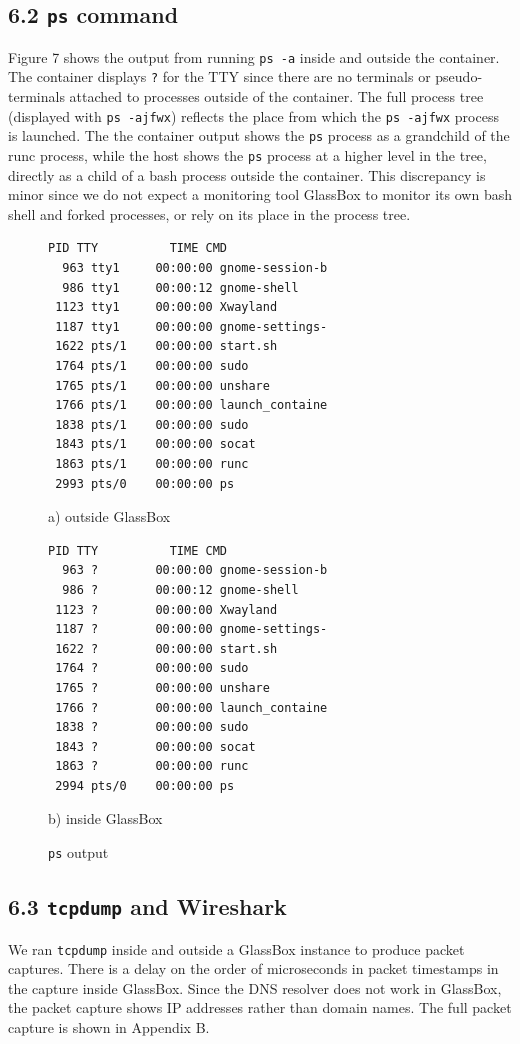 \documentclass{proc}
\begin{document}
\subsection*{6.2 \texttt{ps} command}
Figure 7 shows the output from running \texttt{ps -a} inside and outside the container. The container displays \texttt{?} for the TTY since there are no terminals or pseudo-terminals attached to processes outside of the container. The full process tree (displayed with \texttt{ps -ajfwx}) reflects the place from which the \texttt{ps -ajfwx} process is launched. The the container output shows the \texttt{ps} process as a grandchild of the runc process, while the host shows the \texttt{ps} process at a higher level in the tree, directly as a child of a bash process outside the container. This discrepancy is minor since we do not expect a monitoring tool GlassBox to monitor its own bash shell and forked processes, or rely on its place in the process tree.
 \begin{figure}[h]
\begin{lstlisting}[linewidth=\linewidth]
  PID TTY          TIME CMD
  963 tty1     00:00:00 gnome-session-b
  986 tty1     00:00:12 gnome-shell
 1123 tty1     00:00:00 Xwayland
 1187 tty1     00:00:00 gnome-settings-
 1622 pts/1    00:00:00 start.sh
 1764 pts/1    00:00:00 sudo
 1765 pts/1    00:00:00 unshare
 1766 pts/1    00:00:00 launch_containe
 1838 pts/1    00:00:00 sudo
 1843 pts/1    00:00:00 socat
 1863 pts/1    00:00:00 runc
 2993 pts/0    00:00:00 ps
 \end{lstlisting}
\hspace{7.5em} a) outside GlassBox
 \begin{lstlisting}[linewidth=\linewidth]
  PID TTY          TIME CMD
  963 ?        00:00:00 gnome-session-b
  986 ?        00:00:12 gnome-shell
 1123 ?        00:00:00 Xwayland
 1187 ?        00:00:00 gnome-settings-
 1622 ?        00:00:00 start.sh
 1764 ?        00:00:00 sudo
 1765 ?        00:00:00 unshare
 1766 ?        00:00:00 launch_containe
 1838 ?        00:00:00 sudo
 1843 ?        00:00:00 socat
 1863 ?        00:00:00 runc
 2994 pts/0    00:00:00 ps
\end{lstlisting}
\hspace{7.5em} b) inside GlassBox
 \caption{\texttt{ps} output}
\end{figure}

\subsection*{6.3 \texttt{tcpdump} and Wireshark}
We ran \texttt{tcpdump} inside and outside a GlassBox instance to produce packet captures. There is a delay on the order of microseconds in packet timestamps in the capture inside GlassBox. Since the DNS resolver does not work in GlassBox, the packet capture shows IP addresses rather than domain names. The full packet capture is shown in Appendix B.
\end{document}
